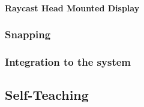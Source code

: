 \paragraph{Raycast Head Mounted Display} \label{sec:RaycastHMD}

\subsubsection{Snapping} \label{sec:snapping}
\subsubsection{Integration to the system} \label{sec:integration}



\subsection{Self-Teaching} \label{sec:selfteaching}

\newpage